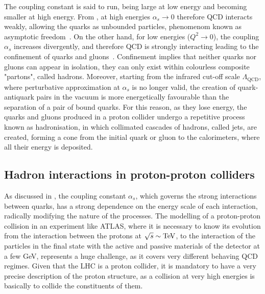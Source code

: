 The coupling constant is said to run, being large at low energy and becoming smaller at high energy. From \Eqn{\ref{eq:theory:sm:mathematical:qcd:alphas}}, at high energies \(\alpha_s \to 0\) therefore \ac{QCD} interacts weakly, allowing the quarks as unbounded particles, phenomenom known as asymptotic freedom~\cite{Wilczek_Gross-1973,Politzer-1973}.
On the other hand, for low energies (\(Q^2 \to 0\)), the coupling \(\alpha_s\) increases divergently, and therefore \ac{QCD} is strongly interacting leading to the confinement of quarks and gluons~\cite{Glashow_Georgi-1974}. Confinement implies that neither quarks nor gluons can appear in isolation, they can only exist within colourless composite "partons", called hadrons.
Moreover, starting from the infrared cut-off scale \(\Lambda_{\text{QCD}}\), where perturbative approximation at \(\alpha_s\) is no longer valid, the creation of quark-antiquark pairs in the vacuum is more energetically favourable than the separation of a pair of bound quarks. For this reason, as they lose energy, the quarks and gluons produced in a proton collider undergo a repetitive process known as hadronisation, in which collimated cascades of hadrons, called jets, are created, forming a cone from the initial quark or gluon to the calorimeters, where all their energy is deposited.


\subsection{Hadron interactions in proton-proton colliders}
\label{subsec:theory:sm:hadron_interactions}

As discussed in \Sect{\ref{subsubsec:theory:sm:mathematical:qcd}}, the coupling constant \(\alpha_s\), which governs the strong interactions between quarks, has a strong dependence on the energy scale of each interaction, radically modifying the nature of the processes. The modelling of a proton-proton collision in an experiment like \ac{ATLAS}, where it is necessary to know its evolution from the interaction between the protons at \(\sqrt{s} \sim \text{TeV}\), to the interaction of the particles in the final state with the active and passive materials of the detector at a few GeV, represents a huge challenge, as it covers very different behaving \ac{QCD} regimes. Given that the \ac{LHC} is a proton collider, it is mandatory to have a very precise description of the proton structure, as a \pp collision at very high energies is basically to collide the constituents of them.

